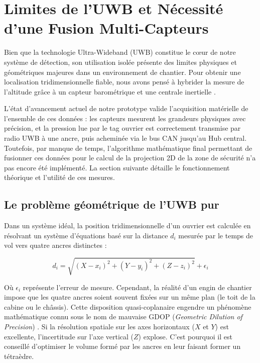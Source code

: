 \newpage
\section{Limites de l'UWB et Nécessité d'une Fusion Multi-Capteurs}

Bien que la technologie Ultra-Wideband (UWB) constitue le cœur de notre système de détection, son utilisation isolée présente des limites physiques et géométriques majeures dans un environnement de chantier. Pour obtenir une localisation tridimensionnelle fiable, nous avons pensé à hybrider la mesure de l'altitude grâce à un capteur barométrique et une centrale inertielle \cite{Heiligers_2020}. 

L'état d'avancement actuel de notre prototype valide l'acquisition matérielle de l'ensemble de ces données : les capteurs mesurent les grandeurs physiques avec précision, et la pression lue par le tag ouvrier est correctement transmise par radio UWB à une ancre, puis acheminée via le bus CAN jusqu'au Hub central. Toutefois, par manque de temps, l'algorithme mathématique final permettant de fusionner ces données pour le calcul de la projection 2D de la zone de sécurité n'a pas encore été implémenté. La section suivante détaille le fonctionnement théorique et l'utilité de ces mesures.

\subsection{Le problème géométrique de l'UWB pur}

Dans un système idéal, la position tridimensionnelle d'un ouvrier est calculée en résolvant un système d'équations basé sur la distance $d_i$ mesurée par le temps de vol vers quatre ancres distinctes :

\begin{equation}
    d_i = \sqrt{(X - x_i)^2 + (Y - y_i)^2 + (Z - z_i)^2} + \epsilon_i
\end{equation}

Où $\epsilon_i$ représente l'erreur de mesure. Cependant, la réalité d'un engin de chantier impose que les quatre ancres soient souvent fixées sur un même plan (le toit de la cabine ou le châssis). Cette disposition quasi-coplanaire engendre un phénomène mathématique connu sous le nom de mauvaise GDOP (\textit{Geometric Dilution of Precision}) \cite{Zhao_2022}. Si la résolution spatiale sur les axes horizontaux ($X$ et $Y$) est excellente, l'incertitude sur l'axe vertical ($Z$) explose. 
C'est pourquoi il est conseillé d'optimiser le volume formé par les ancres en leur faisant former un tétraèdre.

